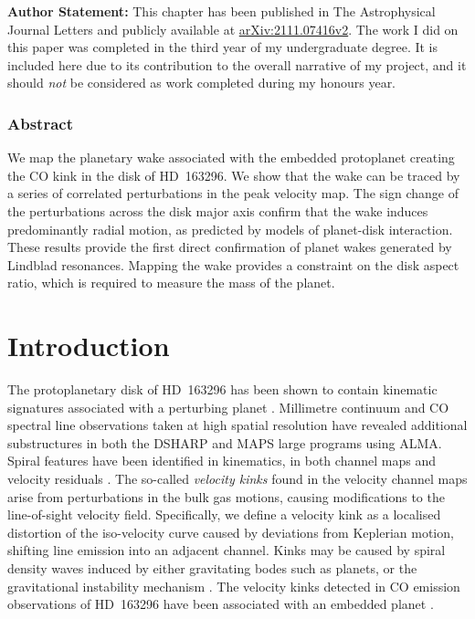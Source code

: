 
\textbf{Author Statement:} This chapter has been published in The Astrophysical Journal Letters \citep{calcino2022} and publicly available at \href{https://arxiv.org/abs/2111.07416v2}{\url{arXiv:2111.07416v2}}.
The work I did on this paper was completed in the third year of my undergraduate degree.
It is included here due to its contribution to the overall narrative of my project, and it should \textit{not} be considered as work completed during my honours year.

\subsubsection{Abstract}

We map the planetary wake associated with the embedded protoplanet creating the CO kink in the disk of HD~163296. We show that the wake can be traced by a series of correlated perturbations in the peak velocity map. The sign change of the perturbations across the disk major axis confirm that the wake induces predominantly radial motion, as predicted by models of planet-disk interaction. These results provide the first direct confirmation of planet wakes generated by Lindblad resonances. Mapping the wake provides a constraint on the disk aspect ratio, which is required to measure the mass of the planet.

\section{Introduction}

The protoplanetary disk of HD~163296 has been shown to contain kinematic signatures associated with a perturbing planet \citep{pinte2018a,teague2018}.
Millimetre continuum and CO spectral line observations taken at high spatial resolution have revealed additional substructures in both the DSHARP \citep{andrews2018,huang2018b,pinte2020,izquierdo2021} and MAPS \citep{oberg2021,teague2021} large programs using ALMA.
Spiral features have been identified in kinematics, in both channel maps and velocity residuals \citep{teague2021}.
The so-called \textit{velocity kinks} found in the velocity channel maps arise from perturbations in the bulk gas motions, causing modifications to the line-of-sight velocity field.
Specifically, we define a velocity kink as a localised distortion of the iso-velocity curve caused by deviations from Keplerian motion, shifting line emission into an adjacent channel.
Kinks may be caused by spiral density waves induced by either gravitating bodes such as planets, or the gravitational instability mechanism \citep{hall2020}.
The velocity kinks detected in CO emission observations of HD~163296 have been associated with an embedded planet \citep{pinte2018a}.

